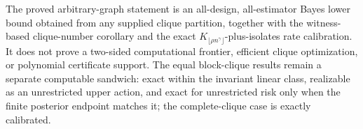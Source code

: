 The proved arbitrary-graph statement is an all-design, all-estimator Bayes lower bound obtained from any supplied clique partition, together with the witness-based clique-number corollary and the exact \(K_{\lfloor\rho n^{\gamma}\rfloor}\)-plus-isolates rate calibration.  It does not prove a two-sided computational frontier, efficient clique optimization, or polynomial certificate support.  The equal block-clique results remain a separate computable sandwich: exact within the invariant linear class, realizable as an unrestricted upper action, and exact for unrestricted risk only when the finite posterior endpoint matches it; the complete-clique case is exactly calibrated.